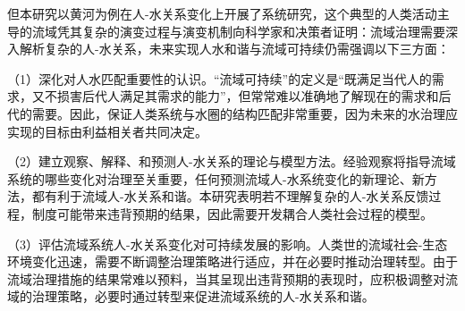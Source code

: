 但本研究以黄河为例在人-水关系变化上开展了系统研究，这个典型的人类活动主导的流域凭其复杂的演变过程与演变机制向科学家和决策者证明：流域治理需要深入解析复杂的人-水关系，未来实现人水和谐与流域可持续仍需强调以下三方面：

（1）深化对人水匹配重要性的认识。“流域可持续”的定义是“既满足当代人的需求，又不损害后代人满足其需求的能力”，但常常难以准确地了解现在的需求和后代的需要。因此，保证人类系统与水圈的结构匹配非常重要，因为未来的水治理应实现的目标由利益相关者共同决定。

（2）建立观察、解释、和预测人-水关系的理论与模型方法。经验观察将指导流域系统的哪些变化对治理至关重要，任何预测流域人-水系统变化的新理论、新方法，都有利于流域人-水关系和谐。本研究表明若不理解复杂的人-水关系反馈过程，制度可能带来违背预期的结果，因此需要开发耦合人类社会过程的模型。

（3）评估流域系统人-水关系变化对可持续发展的影响。人类世的流域社会-生态环境变化迅速，需要不断调整治理策略进行适应，并在必要时推动治理转型。由于流域治理措施的结果常难以预料，当其呈现出违背预期的表现时，应积极调整对流域的治理策略，必要时通过转型来促进流域系统的人-水关系和谐。
